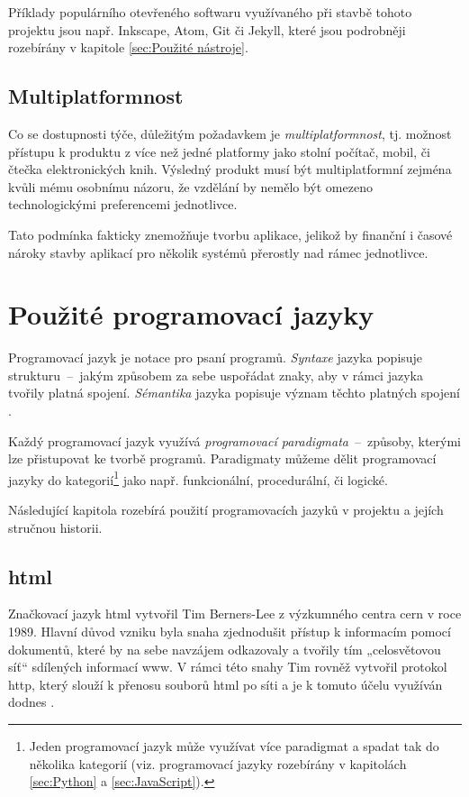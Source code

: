 \documentclass[a4paper, 12pt]{article}
\newcommand*{\fullref}[1]{\hyperref[{#1}]{\ref*{#1}}}
\begin{document}
  Příklady populárního otevřeného softwaru využívaného při stavbě tohoto projektu jsou např. Inkscape, Atom, Git či Jekyll, které jsou podrobněji rozebírány v kapitole \fullref{sec:Použité nástroje}.


  \subsection{Multiplatformnost}
  Co se dostupnosti týče, důležitým požadavkem je \emph{multiplatformnost}, tj. možnost přístupu k produktu z více než jedné platformy jako stolní počítač, mobil, či čtečka elektronických knih. Výsledný produkt musí být multiplatformní zejména kvůli mému osobnímu názoru, že vzdělání by nemělo být omezeno technologickými preferencemi jednotlivce.

  Tato podmínka fakticky znemožňuje tvorbu aplikace, jelikož by finanční i časové nároky stavby aplikací pro několik systémů přerostly nad rámec jednotlivce.


  \section{Použité programovací jazyky}
  Programovací jazyk je notace pro psaní programů. \emph{Syntaxe} jazyka popisuje strukturu~--~jakým způsobem za sebe uspořádat znaky, aby v rámci jazyka tvořily platná spojení. \emph{Sémantika} jazyka popisuje význam těchto platných spojení \cite{intro-to-programming-languages}. %

  Každý programovací jazyk využívá \emph{programovací paradigmata}~--~způsoby, kterými lze přistupovat ke tvorbě programů. Paradigmaty můžeme dělit programovací jazyky do kategorií\footnote{Jeden programovací jazyk může využívat více paradigmat a spadat tak do několika kategorií (viz. programovací jazyky rozebírány v kapitolách \fullref{sec:Python} a \fullref{sec:JavaScript}).} jako např. funkcionální, procedurální, či logické.

  Následující kapitola rozebírá použití programovacích jazyků v projektu a jejích stručnou historii. %


  \subsection{\acrshort{html}} \label{sec:HTML}
  Značkovací jazyk \gls{html} vytvořil Tim Berners-Lee z výzkumného centra \gls{cern} v roce 1989. Hlavní důvod vzniku byla snaha zjednodušit přístup k informacím pomocí dokumentů, které by na sebe navzájem odkazovaly a tvořily tím „celosvětovou síť“ sdílených informací \gls{www}. V rámci této snahy Tim rovněž vytvořil protokol \gls{http}, který slouží k přenosu souborů \gls{html} po síti a je k tomuto účelu využíván dodnes \cite{html-history}.
\end{document}
